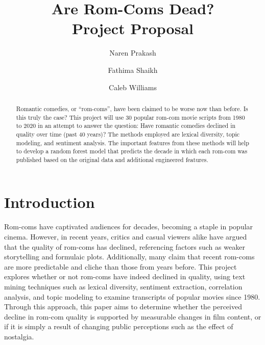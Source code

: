\documentclass[
  authoryear,
  preprint]{elsarticle}
\begin{document}
\begin{frontmatter}
\title{Are Rom-Coms Dead? \\\large{Project Proposal} }
\author[1]{Naren Prakash%
%
}

\author[1]{Fathima Shaikh%
%
}

\author[1]{Caleb Williams%
%
}






        
\begin{abstract}
Romantic comedies, or ``rom-coms'', have been claimed to be worse now
than before. Is this truly the case? This project will use 30 popular
rom-com movie scripts from 1980 to 2020 in an attempt to answer the
question: Have romantic comedies declined in quality over time (past 40
years)? The methods employed are lexical diversity, topic modeling, and
sentiment analysis. The important features from these methods will help
to develop a random forest model that predicts the decade in which each
rom-com was published based on the original data and additional
engineered features.
\end{abstract}





\end{frontmatter}
    

\section{Introduction}\label{introduction}

Rom-coms have captivated audiences for decades, becoming a staple in
popular cinema. However, in recent years, critics and casual viewers
alike have argued that the quality of rom-coms has declined, referencing
factors such as weaker storytelling and formulaic plots. Additionally,
many claim that recent rom-coms are more predictable and cliche than
those from years before. This project explores whether or not rom-coms
have indeed declined in quality, using text mining techniques such as
lexical diversity, sentiment extraction, correlation analysis, and topic
modeling to examine transcripts of popular movies since 1980. Through
this approach, this paper aims to determine whether the perceived
decline in rom-com quality is supported by measurable changes in film
content, or if it is simply a result of changing public perceptions such
as the effect of nostalgia.
\end{document}
